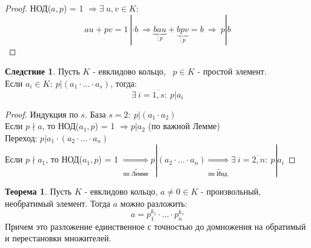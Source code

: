 \documentclass[a4paper, 12pt]{article}
\theoremstyle{definition}
\newtheorem*{theorem}{Теорема}
\newtheorem*{consequense}{Следствие}
\begin{document}
  \begin{proof}
    НОД($a,p$) = 1 $\Longrightarrow \exists \ u, v \in K:$ 
    $$ au+pv = 1 \ | \cdot b \ \Longrightarrow \underbrace{bau}_{\vdots \ p} +\underbrace{bpv}_{\vdots \ p}  = b  \ \Longrightarrow \ p|b$$ 
  \end{proof}
  \begin{consequense}
    Пусть $K$ - евклидово кольцо, \ $p \in K$ - простой элемент.\\
    Если $a_i \in K: \ p|(a_1\cdot ... \cdot a_s)$, тогда:
    $$\exists \ i = \overline{1, s}: \ p|a_i$$  
  \end{consequense}
  \begin{proof}
    Индукция по $s$. База $s=2: \ p|(a_1 \cdot a_2)$ \\
    Если $p\nmid a$, то НОД($a_1,p$) = 1 $\Longrightarrow p | a_2$ (по важной Лемме)\\
    Переход: $p|a_1 \cdot (a_2\cdot ... \cdot a_n)$\\
    Если $p \nmid a_1$, то НОД($a_1,p$) = 1 $\underbrace{\Longrightarrow}_{\text{по Лемме}} p|(a_2\cdot ... \cdot a_n) \underbrace{\Longrightarrow}_{\text{по Инд.}}  \exists \ i = \overline{2, n}: \ p|a_i$  
  \end{proof} 
  \begin{theorem}
    Пусть $K$ - евклидово кольцо, $a\neq 0 \in K$ - произвольный, необратимый элемент. Тогда $a$ можно разложить:
    $$a = p_1^{k_1}\cdot ...\cdot p_n^{k_s}$$
    Причем это разложение единственное с точностью до домножения на обратимый и перестановки множителей.   
  \end{theorem}
\end{document}
